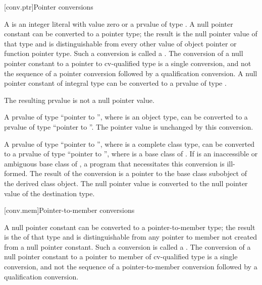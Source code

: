 [conv.ptr]{Pointer conversions}

\pnum
{}%
%
%
%
A  is an integer literal with
value zero
or a prvalue of type . A null pointer constant can be
converted to a pointer type; the
result is the null pointer value of that type and is
distinguishable from every other value of
object pointer or function pointer
type.
Such a conversion is called a .
The conversion of a null pointer constant to a pointer to
cv-qualified type is a single conversion, and not the sequence of a
pointer conversion followed by a qualification
conversion. A null pointer constant of integral type
can be converted to a prvalue of type .
\begin{note}
The resulting prvalue is not a null pointer value.
\end{note}

\pnum
A prvalue of type ``pointer to \cv{} '', where 
is an object type, can be converted to a prvalue of type ``pointer to
\cv{} ''.
The pointer value is unchanged by this conversion.

\pnum
A prvalue of type ``pointer to \cv{} '', where 
is a complete class type, can be converted to a prvalue of type ``pointer to
\cv{} '', where  is a base class
of . If  is an
inaccessible or
ambiguous base class of , a program
that necessitates this conversion is ill-formed. The result of the
conversion is a pointer to the base class subobject of the derived class
object. The null pointer value is converted to the null pointer value of
the destination type.

[conv.mem]{Pointer-to-member conversions}

\pnum
{}%
%
%
A null pointer constant can be converted to a
pointer-to-member
type; the result is the 
of that type and is distinguishable from any pointer to member not
created from a null pointer constant.
Such a conversion is called a .
The conversion of a null pointer
constant to a pointer to member of cv-qualified type is a single
conversion, and not the sequence of a pointer-to-member conversion
followed by a qualification conversion.

